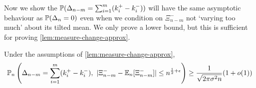 Now we show the $\P(\Delta_{n-m} = \sum_{i=1}^m (k_i^+ - k_i^-))$ will have the same asymptotic behaviour as $\P(\Delta_n = 0)$ even when we condition on $\Xi_{n-m}^-$ not `varying too much' about its tilted mean. We only prove a lower bound, but this is sufficient for proving \cref{lem:measure-change-approx}.
\begin{lemma}
    \label{lem:mod-dev-local}
    Under the assumptions of \cref{lem:measure-change-approx},
    \begin{equation*}
        \mathbb P_n \left(
            \Delta_{n-m} = \sum_{i=1}^m (k_i^+ - k_i^-), \ 
            \abs{\Xi^-_{n-m} - \E_n[\Xi^-_{n-m}]} \leq n^{\frac{1}{2} + \epsilon}
        \right)
        \geq \frac{1}{\sqrt{2 \pi \sigma^2 n}} (1 + \littleo(1))
    \end{equation*}
\end{lemma}

